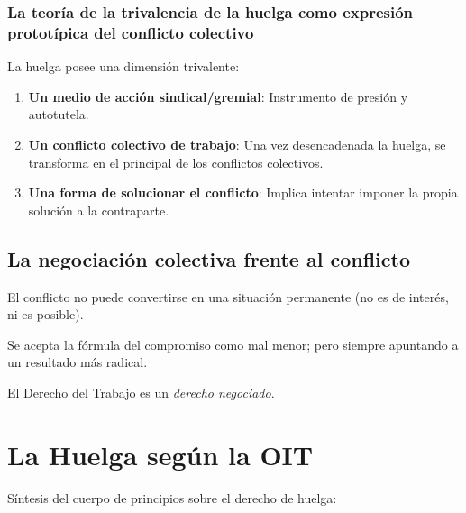 \documentclass[spanish,12pt,a4paper,titlepage]{report}
\begin{document}
\subsubsection{La teoría de la trivalencia de la huelga como expresión prototípica del conflicto colectivo}
\label{sec:La-teoria-de-la-trivalencia-de-la-huelga-como-expresion-prototipica-del-conflicto-colectivo}

La huelga posee una dimensión trivalente:

\begin{enumerate}
\item \textbf{Un medio de acción sindical/gremial}: Instrumento de presión y autotutela.
\item \textbf{Un conflicto colectivo de trabajo}: Una vez desencadenada la huelga, se transforma en el principal de los conflictos colectivos.
\item \textbf{Una forma de solucionar el conflicto}: Implica intentar imponer la propia solución a la contraparte.
\end{enumerate}

\subsection{La negociación colectiva frente al conflicto}
\label{sec:La-negociacion-colectiva-frente-al-conflicto}

El conflicto no puede convertirse en una situación permanente (no es de interés, ni es posible).

Se acepta la fórmula del compromiso como mal menor; pero siempre apuntando a un resultado más radical.

El Derecho del Trabajo es un \textit{derecho negociado}.

\section{La Huelga según la OIT}
\label{sec:la-huelga-segun-la-oit}

Síntesis del cuerpo de principios sobre el derecho de huelga:
\end{document}
